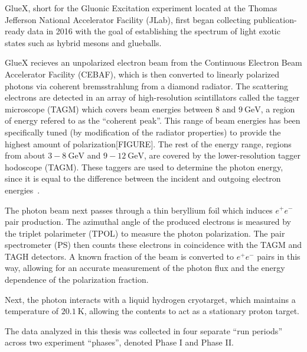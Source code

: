 GlueX, short for the Gluonic Excitation experiment located at the Thomas Jefferson National Accelerator Facility (JLab), first began collecting publication-ready data in 2016 with the goal of establishing the spectrum of light exotic states such as hybrid mesons and glueballs.

GlueX recieves an unpolarized electron beam from the Continuous Electron Beam Accelerator Facility (CEBAF), which is then converted to linearly polarized photons via coherent bremsstrahlung from a diamond radiator. The scattering electrons are detected in an array of high-resolution scintillators called the tagger microscope (TAGM) which covers beam energies between $8$ and $\SI{9}{\giga\eV}$, a region of energy refered to as the ``coherent peak''. This range of beam energies has been specifically tuned (by modification of the radiator properties) to provide the highest amount of polarization{\color{red}[FIGURE]}. The rest of the energy range, regions from about $3-\SI{8}{\giga\eV}$ and $9-\SI{12}{\giga\eV}$, are covered by the lower-resolution tagger hodoscope (TAGM). These taggers are used to determine the photon energy, since it is equal to the difference between the incident and outgoing electron energies~\cite{adhikari_gluex_2021}.

The photon beam next passes through a thin beryllium foil which induces $e^+e^-$ pair production. The azimuthal angle of the produced electrons is measured by the triplet polarimeter (TPOL) to measure the photon polarization. The pair spectrometer (PS) then counts these electrons in coincidence with the TAGM and TAGH detectors. A known fraction of the beam is converted to $e^+e^-$ pairs in this way, allowing for an accurate measurement of the photon flux and the energy dependence of the polarization fraction.

Next, the photon interacts with a liquid hydrogen cryotarget, which maintains a temperature of $\SI{20.1}{\K}$, allowing the contents to act as a stationary proton target.


The data analyzed in this thesis was collected in four separate ``run periods'' across two experiment ``phases'', denoted Phase I and Phase II. 
